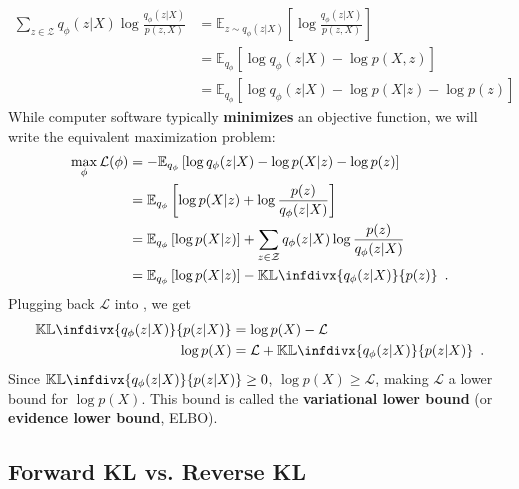 \documentclass[12pt]{article}
\newcommand*\KL{\mathop{}\!\mathbb{KL}}
\newcommand{\infdiv}{\KL\infdivx}
\begin{document}
\begin{align}
    \sum_{z \in \mathcal{Z}}
    q_\phi(z \vert X)
    \log
    \frac{q_\phi(z \vert X)}{p(z, X)} &=
    \mathbb{E}_{z \sim q_\phi (z \vert X)}
    \left[
        \log \frac{q_\phi(z \vert X)}{p(z, X)}
    \right] \\
    &= \mathbb{E}_{q_\phi} \left[
        \log q_\phi(z \vert X) - \log p(X, z)
    \right] \\
    &= \mathbb{E}_{q_\phi} \left[
        \log q_\phi(z \vert X) - \log p(X \vert z) - \log p(z)
    \right]
\end{align}
%
While computer software typically \textbf{minimizes} an objective function, we will write the equivalent maximization problem:
%
\begin{align}
    \label{eq:var_low_bound}
    \max_\phi \mathcal{L}(\phi) &=
    - \mathbb{E}_{q_\phi} \left[
        \log q_\phi(z \vert X) - \log p(X \vert z) - \log p(z)
    \right] \\
    &= \mathbb{E}_{q_\phi} \left[
        \log p(X \vert z)
        + \log \frac{p(z)}{q_\phi(z \vert X)}
    \right] \\
    &= \mathbb{E}_{q_\phi} \left[
        \log p(X \vert z)
    \right] +
    \sum_{z \in \mathcal{Z}}
    q_\phi(z \vert X) \log \frac{p(z)}{q_\phi(z \vert X)} \\
    &= \mathbb{E}_{q_\phi} \left[
        \log p(X \vert z)
    \right] -
    \infdiv{q_\phi(z \vert X)}{p(z)}
    \enspace .
\end{align}
%
Plugging back $\mathcal{L}$ into , we get
%
\begin{align}
    \begin{split}
    \infdiv{q_\phi(z \vert X)}{p(z \vert X)} &=
    \log p(X) - \mathcal{L} \\
    \log p(X) &= \mathcal{L} +
    \infdiv{q_\phi(z \vert X)}{p(z \vert X)} 
    \enspace .
    \end{split}
\end{align} 
%
Since $\infdiv{q_\phi(z \vert X)}{p(z \vert X)} \geq 0$, $\log p(X) \geq \mathcal{L}$, making $\mathcal{L}$ a lower bound for $\log p(X)$.
This bound is called the \textbf{variational lower bound} (or \textbf{evidence lower bound}, ELBO).

\subsection{Forward KL vs. Reverse KL}
\end{document}
